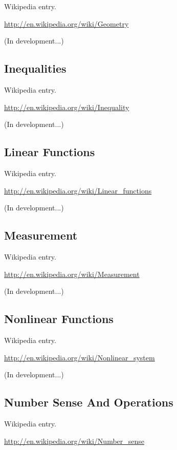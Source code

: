 \documentclass[12pt,oneside]{book}
\begin{document}
Wikipedia entry.

\href{http://en.wikipedia.org/wiki/Geometry}{http://en.wikipedia.org/wiki/Geometry}

(In development...)

\subsection[Inequalities]{Inequalities}

Wikipedia entry.

\href{http://en.wikipedia.org/wiki/Inequality}{http://en.wikipedia.org/wiki/Inequality}

(In development...)

\subsection[Linear Functions]{Linear Functions}

Wikipedia entry.

\href{http://en.wikipedia.org/wiki/Linear_functions}{http://en.wikipedia.org/wiki/Linear\_functions}

(In development...)

\subsection[Measurement]{Measurement}

Wikipedia entry.

\href{http://en.wikipedia.org/wiki/Measurement}{http://en.wikipedia.org/wiki/Measurement}

(In development...)

\subsection[Nonlinear Functions]{Nonlinear Functions}

Wikipedia entry.

\href{http://en.wikipedia.org/wiki/Nonlinear_system}{http://en.wikipedia.org/wiki/Nonlinear\_system}

(In development...)

\subsection[Number Sense And Operations]{Number Sense And Operations}

Wikipedia entry.

\href{http://en.wikipedia.org/wiki/Number_sense}{http://en.wikipedia.org/wiki/Number\_sense}
\end{document}
